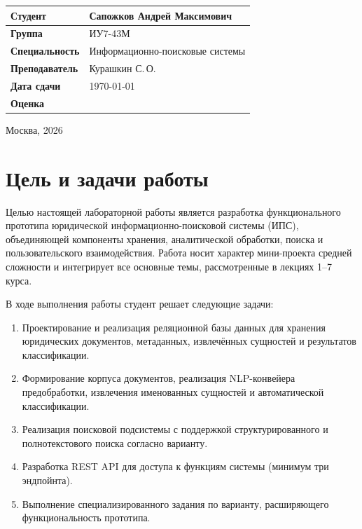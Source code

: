 \documentclass[a4paper,12pt]{article}
\newcommand{\StudentName}{Сапожков Андрей Максимович}
\newcommand{\StudentGroup}{ИУ7-43М}
\newcommand{\StudentSpec}{Информационно-поисковые системы}
\newcommand{\TeacherName}{Курашкин С.\,О.}
\newcommand{\SubmitDate}{\today}
\begin{document}
\begin{titlepage}
\begin{center}
\vspace{16pt}

\begin{tabular}{|>{\bfseries\small}p{4.5cm}|p{7cm}|}
\hline
Студент        & \StudentName    \\ \hline
Группа         & \StudentGroup   \\ \hline
Специальность  & \StudentSpec    \\ \hline
Преподаватель  & \TeacherName    \\ \hline
Дата сдачи     & \SubmitDate     \\ \hline
Оценка         &                 \\ \hline
\end{tabular}

\vfill
{\normalsize Москва, 2026}
\end{center}
\end{titlepage}

\tableofcontents
\newpage


\section{Цель и задачи работы}

Целью настоящей лабораторной работы является разработка функционального прототипа юридической информационно-поисковой системы (ИПС), объединяющей компоненты хранения, аналитической обработки, поиска и пользовательского взаимодействия. Работа носит характер мини-проекта средней сложности и интегрирует все основные темы, рассмотренные в лекциях 1--7 курса.

В ходе выполнения работы студент решает следующие задачи:
\begin{enumerate}[leftmargin=2cm]
  \item Проектирование и реализация реляционной базы данных для хранения юридических документов, метаданных, извлечённых сущностей и результатов классификации.
  \item Формирование корпуса документов, реализация NLP-конвейера предобработки, извлечения именованных сущностей и автоматической классификации.
  \item Реализация поисковой подсистемы с поддержкой структурированного и полнотекстового поиска согласно варианту.
  \item Разработка REST API для доступа к функциям системы (минимум три эндпойнта).
  \item Выполнение специализированного задания по варианту, расширяющего функциональность прототипа.
\end{enumerate}
\end{document}

